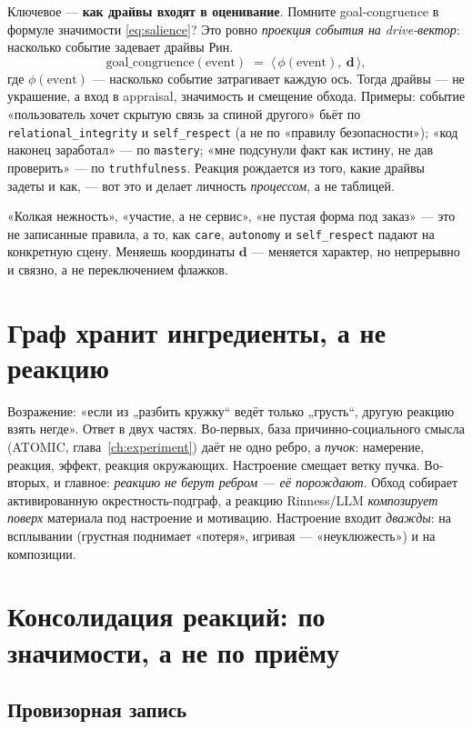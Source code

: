 Ключевое — \textbf{как драйвы входят в оценивание}. Помните goal-congruence в формуле
значимости \eqref{eq:salience}? Это ровно \emph{проекция события на drive-вектор}:
насколько событие задевает драйвы Рин.
\[
\text{goal\_congruence}(\text{event}) \;=\; \langle\, \phi(\text{event}),\ \mathbf{d}\,\rangle,
\]
где $\phi(\text{event})$ — насколько событие затрагивает каждую ось. Тогда драйвы —
не украшение, а вход в appraisal, значимость и смещение обхода. Примеры: событие
«пользователь хочет скрытую связь за спиной другого» бьёт по
\texttt{relational\_integrity} и \texttt{self\_respect} (а не по «правилу
безопасности»); «код наконец заработал» — по \texttt{mastery}; «мне подсунули факт как
истину, не дав проверить» — по \texttt{truthfulness}. Реакция рождается из того, какие
драйвы задеты и как, — вот это и делает личность \emph{процессом}, а не таблицей.

\begin{intuition}
«Колкая нежность», «участие, а не сервис», «не пустая форма под заказ» — это не
записанные правила, а то, как \texttt{care}, \texttt{autonomy} и \texttt{self\_respect}
падают на конкретную сцену. Меняешь координаты $\mathbf{d}$ — меняется характер, но
непрерывно и связно, а не переключением флажков.
\end{intuition}

\section{Граф хранит ингредиенты, а не реакцию}

Возражение: «если из „разбить кружку“ ведёт только „грусть“, другую реакцию взять
негде». Ответ в двух частях. Во-первых, база причинно-социального смысла (ATOMIC,
глава~\ref{ch:experiment}) даёт не одно ребро, а \emph{пучок}: намерение, реакция,
эффект, реакция окружающих. Настроение смещает ветку пучка. Во-вторых, и главное:
\emph{реакцию не берут ребром — её порождают}. Обход собирает активированную
окрестность-подграф, а реакцию Rinness/LLM \emph{композирует поверх} материала под
настроение и мотивацию. Настроение входит \emph{дважды}: на всплывании (грустная
поднимает «потеря», игривая — «неуклюжесть») и на композиции.

\section{Консолидация реакций: по значимости, а не по приёму}

\subsection{Провизорная запись}

